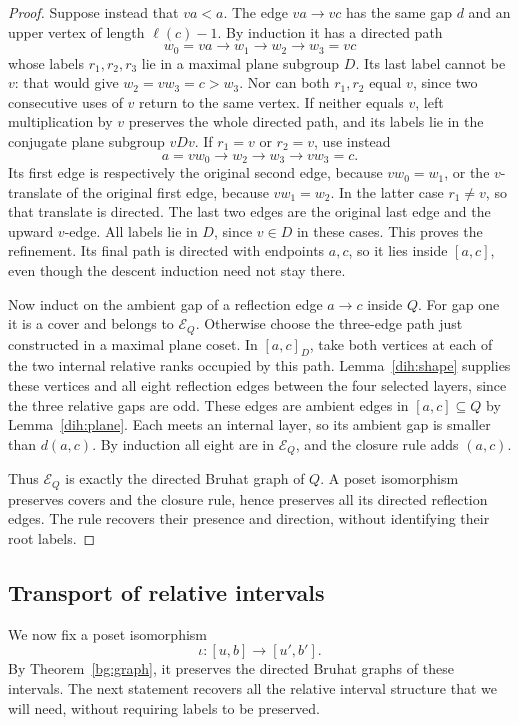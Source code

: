 \begin{proof}
Suppose instead that $va<a$. The edge $va\to vc$ has the same gap $d$ and
an upper vertex of length $\ell(c)-1$. By induction it has a directed path
\[
 w_0=va\longrightarrow w_1\longrightarrow w_2\longrightarrow w_3=vc
\]
whose labels $r_1,r_2,r_3$ lie in a maximal plane subgroup $D$. Its last
label cannot be $v$: that would give $w_2=vw_3=c>w_3$. Nor can both
$r_1,r_2$ equal $v$, since two consecutive uses of $v$ return to the same
vertex. If neither equals $v$, left multiplication by $v$ preserves the
whole directed path, and its labels lie in the conjugate plane subgroup
$vDv$. If $r_1=v$ or $r_2=v$, use instead
\[
 a=vw_0\longrightarrow w_2\longrightarrow w_3\longrightarrow vw_3=c.
\]
Its first edge is respectively the original second edge, because
$vw_0=w_1$, or the $v$-translate of the original first edge, because
$vw_1=w_2$. In the latter case $r_1\ne v$, so that translate is directed.
The last two edges are the original last edge and the upward $v$-edge.
All labels lie in $D$, since $v\in D$ in these cases. This proves the
refinement. Its final path is directed with endpoints $a,c$, so it lies
inside $[a,c]$, even though the descent induction need not stay there.

Now induct on the ambient gap of a reflection edge $a\to c$ inside $Q$.
For gap one it is a cover and belongs to $\mathcal E_Q$. Otherwise choose
the three-edge path just constructed in a maximal plane coset. In
$[a,c]_D$, take both vertices at each of the two internal relative ranks
occupied by this path. Lemma~\ref{dih:shape} supplies these vertices and
all eight reflection edges between the four selected layers, since the
three relative gaps are odd. These edges are ambient edges in
$[a,c]\subseteq Q$ by Lemma~\ref{dih:plane}. Each meets an internal layer,
so its ambient gap is smaller than $d(a,c)$. By induction all eight are in
$\mathcal E_Q$, and the closure rule adds $(a,c)$.

Thus $\mathcal E_Q$ is exactly the directed Bruhat graph of $Q$. A poset
isomorphism preserves covers and the closure rule, hence preserves all
its directed reflection edges. The rule recovers their presence and
direction, without identifying their root labels.
\end{proof}

\subsection{Transport of relative intervals}

We now fix a poset isomorphism
\[
 \iota:[u,b]\longrightarrow[u',b'].
\]
By Theorem~\ref{bg:graph}, it preserves the directed Bruhat graphs of these
intervals.  The next statement recovers all the relative interval
structure that we will need, without requiring labels to be
preserved.

